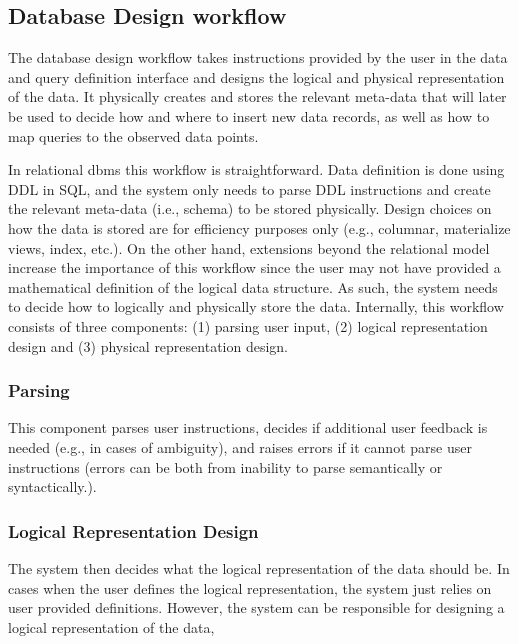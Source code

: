 \subsection{Database Design workflow}
The database design workflow takes instructions provided by the user in the data and query definition interface and designs the logical and physical representation of the data. It physically creates and stores the relevant meta-data that will later be used to decide how and where to insert new data records, as well as how to map queries to the observed data points.

In relational dbms this workflow is straightforward. Data definition is done using DDL in SQL, and the system only needs to parse DDL instructions and create the relevant meta-data (i.e., schema) to be stored physically. Design choices on how the data is stored are for efficiency purposes only (e.g., columnar, materialize views, index, etc.). %
On the other hand, extensions beyond the relational model increase the importance of this workflow since the user may not have provided a mathematical definition of the logical data structure. As such, the system needs to decide how to logically and physically store the data. Internally, this workflow consists of three components: (1) parsing user input, (2) logical representation design and (3) physical representation design. 

\subsubsection{Parsing}
This component parses user instructions, decides if additional user feedback is needed (e.g., in cases of ambiguity), and raises errors if it cannot parse user instructions (errors can be both from inability to parse semantically or syntactically.). 


\subsubsection{Logical Representation Design}
The system then decides what the logical representation of the data should be. In cases when the user defines the logical representation, the system just relies on user provided definitions. However, the system can be responsible for designing a logical representation of the data,

